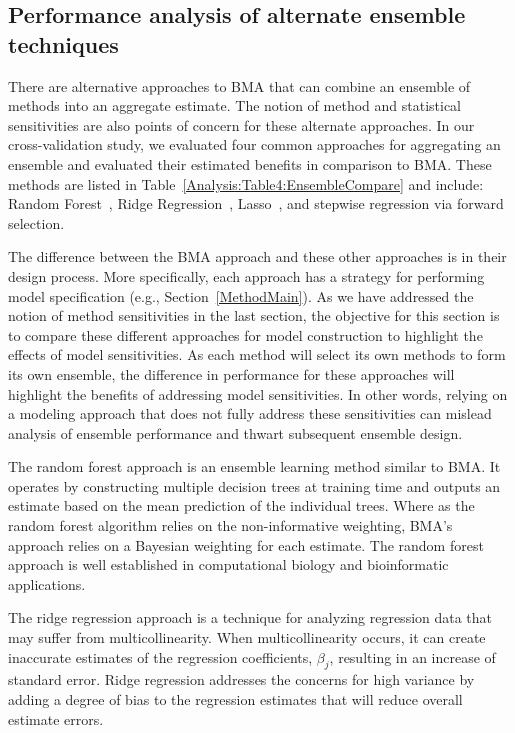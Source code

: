 \documentclass[journal=jpcbfk, manuscript=article]{achemso}
\newcommand{\+}[1]{\ensuremath{\mathbf{#1}}}
\newcommand{\rev}[1]{#1}
\begin{document}
\subsection{\rev{Performance analysis of alternate ensemble techniques}}
\label{Results:BMA_Variants}
\rev{There are alternative approaches to BMA that can combine an ensemble of methods into an aggregate estimate.
The notion of method and statistical sensitivities are also points of concern for these alternate approaches.}
In our cross-validation study, we evaluated four common approaches for aggregating an ensemble and evaluated their estimated benefits in comparison to BMA.
These methods are listed in Table~\ref{Analysis:Table4:EnsembleCompare} and include: Random Forest~\cite{Breiman:2001}, Ridge Regression~\cite{Hoerl:2000}, Lasso~\cite{Tibshirani:1994}, and stepwise regression via forward selection.

\rev{The difference between the BMA approach and these other approaches is in their design process.
More specifically, each approach has a strategy for performing model specification (e.g., Section~\ref{MethodMain}).
As we have addressed the notion of method sensitivities in the last section, the objective for this section is to compare these different approaches for model construction to highlight the effects of model sensitivities.
As each method will select its own methods to form its own ensemble, the difference in performance for these approaches will highlight the benefits of addressing model sensitivities.
In other words, relying on a modeling approach that does not fully address these sensitivities can mislead analysis of ensemble performance and thwart subsequent ensemble design.}

\rev{The random forest approach is an ensemble learning method similar to BMA.
	It operates by constructing multiple decision trees at training time and outputs an estimate based on the mean prediction of the individual trees. 
Where as the random forest algorithm relies on the non-informative weighting, BMA's approach relies on a Bayesian weighting for each estimate.
The random forest approach is well established in computational biology and bioinformatic applications.}

\rev{The ridge regression approach is a technique for analyzing regression data that may suffer from multicollinearity. 
When multicollinearity occurs, it can create inaccurate estimates of the regression coefficients, $\beta_j$, resulting in an increase of standard error.
Ridge regression addresses the concerns for high variance by adding a degree of bias to the regression estimates that will reduce overall estimate errors.} 
\end{document}
